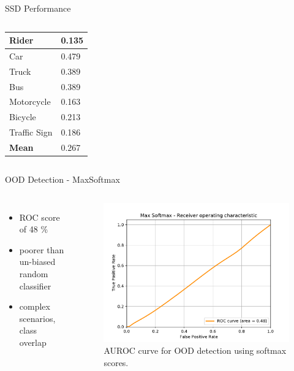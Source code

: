 \documentclass[10pt, aspectratio=169]{beamer}
\begin{document}
\begin{frame}{SSD Performance}
\begin{itemize}
\begin{columns}
\begin{table}
\begin{tabular}{ll}
                        Rider          & 0.135              \\ \hline
                        Car            & 0.479              \\ \hline
                        Truck          & 0.389             \\ \hline
                        Bus            & 0.389               \\ \hline 
                        Motorcycle     & 0.163              \\ \hline
                        Bicycle        & 0.213              \\ \hline
                        Traffic Sign   & 0.186              \\ \hline
                        \textbf{Mean}  & 0.267  \\\hline
                \end{tabular}
            \end{table}
        \end{columns}
    \end{itemize}
\end{frame}

\begin{frame}{OOD Detection - MaxSoftmax}
    \begin{columns}
            \begin{itemize}
                \item ROC score of 48 \%
                \item poorer than un-biased random classifier
                \item complex scenarios, class overlap
            \end{itemize}
            \begin{figure}[!ht]
                \centering
                \includegraphics[scale=0.45]{images/Max Softmax_ROC.pdf}
                \caption[SSD framework]{AUROC curve for OOD detection using softmax scores.}
            \end{figure}
    \end{columns}
\end{frame}
\end{document}
